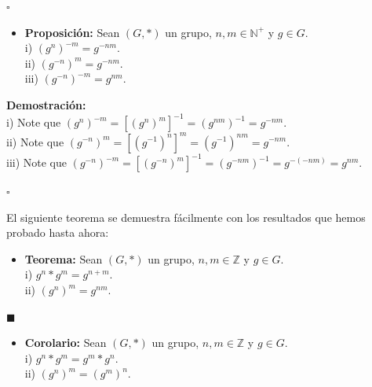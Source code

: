 \documentclass[10 pt]{article}
\begin{document}
\begin{flushright}
    $\square$
\end{flushright}

\begin{itemize}
    \item \Large{\textbf{Proposición:} Sean $(G,*)$ un grupo, $n,m \in \mathbb N^+$ y $g \in G$. \\

    i) $(g^n)^{-m}=g^{-nm}$. \\

    ii) $(g^{-n})^m=g^{-nm}$. \\

    iii) $(g^{-n})^{-m}=g^{nm}$.} \\
\end{itemize}

\Large{\textbf{Demostración:} \\

i) Note que $(g^{n})^{-m}=[(g^{n})^m]^{-1}=(g^{nm})^{-1}=g^{-nm}$. \\

ii) Note que $(g^{-n})^m=[(g^{-1})^n]^m=(g^{-1})^{nm}=g^{-nm}$. \\

iii) Note que $(g^{-n})^{-m}=[(g^{-n})^m]^{-1}=(g^{-nm})^{-1}=g^{-(-nm)}=g^{nm}$.} \\

\begin{flushright}
    $\square$
\end{flushright}

\Large{El siguiente teorema se demuestra fácilmente con los resultados que hemos probado hasta ahora:} \\

\begin{itemize}
    \item \Large{\textbf{Teorema:} Sean $(G,*)$ un grupo, $n,m \in \mathbb Z$ y $g \in G$. \\

    i) $g^n*g^m=g^{n+m}$. \\

    ii) $(g^{n})^{m}=g^{nm}$.} \\
\end{itemize}

\begin{flushright}
    $\blacksquare$
\end{flushright}

\begin{itemize}
    \item \Large{\textbf{Corolario:} Sean $(G,*)$ un grupo, $n,m \in \mathbb Z$ y $g \in G$. \\

    i) $g^{n}*g^{m}=g^m*g^n$. \\

    ii) $(g^{n})^m=(g^{m})^n$.}\\
\end{itemize}
\end{document}

